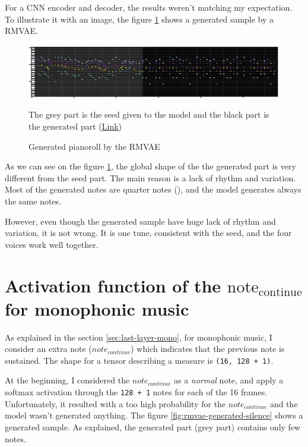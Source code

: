 \documentclass[12pt]{report}
\begin{document}
For a CNN encoder and decoder, the results weren't matching my expectation.
To illustrate it with an image, the figure \ref{fig:rmvae-generated} shows a generated sample by a RMVAE.

\begin{figure}[htpb]
    \centering
    \includegraphics[width=\textwidth]{images/generated_midis/RMVAE/generated_cnn.jpg}
    \caption{Generated pianoroll by the RMVAE}
    The grey part is the seed given to the model and the black part is the generated part   (\href{https://github.com/ValentinVignal/midiGenerator/blob/master/samples/results/generated_pianoroll.mid}{Link})
    \label{fig:rmvae-generated}
\end{figure}

As we can see on the figure \ref{fig:rmvae-generated}, the global shape of the the generated part is very different from the seed part.
The main reason is a lack of rhythm and variation.
Most of the generated notes are quarter notes (\musQuarter), and the model generates always the same notes.

However, even though the generated sample have huge lack of rhythm and variation, it is not wrong.
It is one tune, consistent with the seed, and the four voices work well together.

\section{Activation function of the $\text{note}_{\text{continue}}$ for monophonic music}

As explained in the section \ref{sec:last-layer-mono}, for monophonic music, I consider an extra note ($note_{continue}$) which indicates that the previous note is sustained.
The shape for a tensor describing a measure is \texttt{(16, 128 + 1)}.

At the beginning, I considered the $note_{continue}$ as a \textit{normal} note, and apply a softmax activation through the \texttt{128 + 1} notes for each of the 16 frames.
Unfortunately, it resulted with a too high probability for the $note_{continue}$ and the model wasn't generated anything.
The figure \ref{fig:rmvae-generated-silence} shows a generated sample.
As explained, the generated part (grey part) contains only few notes.
\end{document}
